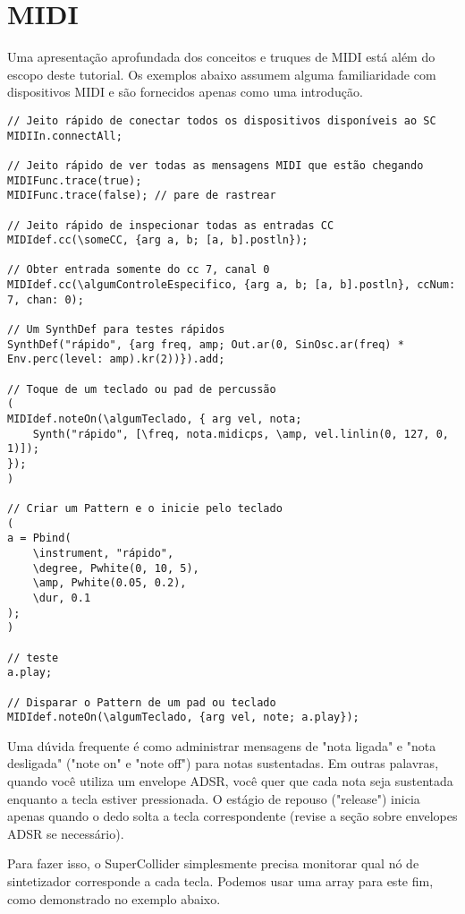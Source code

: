 \section{MIDI}

Uma apresentação aprofundada dos conceitos e truques de MIDI está além do escopo deste tutorial. Os exemplos abaixo assumem alguma familiaridade com dispositivos MIDI e são fornecidos apenas como uma introdução.


\begin{lstlisting}[style=SuperCollider-IDE, basicstyle=\scttfamily\footnotesize]
// Jeito rápido de conectar todos os dispositivos disponíveis ao SC
MIDIIn.connectAll;

// Jeito rápido de ver todas as mensagens MIDI que estão chegando
MIDIFunc.trace(true);
MIDIFunc.trace(false); // pare de rastrear

// Jeito rápido de inspecionar todas as entradas CC
MIDIdef.cc(\someCC, {arg a, b; [a, b].postln});

// Obter entrada somente do cc 7, canal 0
MIDIdef.cc(\algumControleEspecifico, {arg a, b; [a, b].postln}, ccNum: 7, chan: 0);

// Um SynthDef para testes rápidos
SynthDef("rápido", {arg freq, amp; Out.ar(0, SinOsc.ar(freq) * Env.perc(level: amp).kr(2))}).add;

// Toque de um teclado ou pad de percussão
(
MIDIdef.noteOn(\algumTeclado, { arg vel, nota;
	Synth("rápido", [\freq, nota.midicps, \amp, vel.linlin(0, 127, 0, 1)]);
});
)

// Criar um Pattern e o inicie pelo teclado
(
a = Pbind(
	\instrument, "rápido",
	\degree, Pwhite(0, 10, 5),
	\amp, Pwhite(0.05, 0.2),
	\dur, 0.1
);
)

// teste
a.play;

// Disparar o Pattern de um pad ou teclado
MIDIdef.noteOn(\algumTeclado, {arg vel, note; a.play});
\end{lstlisting}

Uma dúvida frequente é como administrar mensagens de "nota ligada" e "nota desligada" ("note on" e "note off") para notas sustentadas. Em outras palavras, quando você utiliza um envelope ADSR, você quer que cada nota seja sustentada enquanto a tecla estiver pressionada. O estágio de repouso ("release") inicia apenas quando o dedo solta a tecla correspondente (revise a seção sobre envelopes ADSR se necessário).

Para fazer isso, o SuperCollider simplesmente precisa monitorar qual nó de sintetizador corresponde a cada tecla. Podemos usar uma array para este fim, como demonstrado no exemplo abaixo. 

